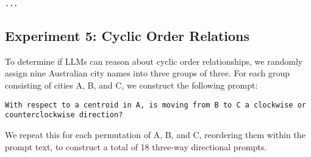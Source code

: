 \begin{lstlisting}[title=Prompt 7: Topological Relation Prompt]
    ...
\end{lstlisting}





\subsection{Experiment 5: Cyclic Order Relations}


To determine if LLMs can reason about cyclic order relationships, we randomly assign nine Australian city names into three groups of three.
For each group consisting of cities A, B, and C, we construct the following prompt: 

\begin{lstlisting}[title=Prompt 8: Cyclic Order Relation Prompt]
    With respect to a centroid in A, is moving from B to C a clockwise or counterclockwise direction?
\end{lstlisting}

We repeat this for each permutation of A, B, and C, reordering them within the prompt text, to construct a total of 18 three-way directional prompts.















